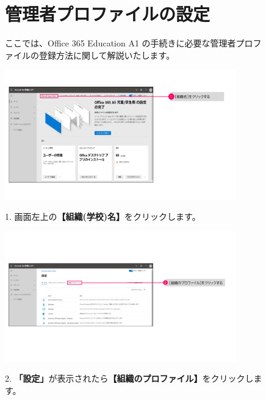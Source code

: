 \begin{figure}[h]
    \begin{minipage}{1.0\textwidth}
        \section{管理者プロファイルの設定}
        ここでは、Office 365 Education A1 の手続きに必要な管理者プロファイルの登録方法に関して解説いたします。
    \end{minipage}
\end{figure}

\begin{figure}[h]
    \begin{minipage}{0.6\textwidth}
        \includegraphics[width=10cm]{figures/O365A1_profile00.png}
    \end{minipage}
    \begin{minipage}{0.4\textwidth}
       1. 画面左上の\textbf{【組織(学校)名】}をクリックします。
    \end{minipage}
\end{figure}

\begin{figure}[h]
    \begin{minipage}{0.6\textwidth}
        \includegraphics[width=10cm]{figures/O365A1_profile01.png}
    \end{minipage}
    \begin{minipage}{0.4\textwidth}
       2. \textbf{「設定」}が表示されたら\textbf{【組織のプロファイル】}をクリックします。
    \end{minipage}
\end{figure}

